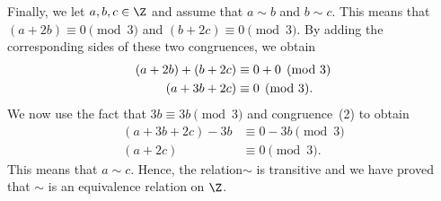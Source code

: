 \begin{enumerate}
\begin{enumerate}
\begin{myproof}
Finally, we let $a, b, c \in \Z$ and assume that $a \sim b$ and $b \sim c$.  This means that 
$\left( a + 2b \right) \equiv 0\pmod 3$ and 
$\left( b + 2c \right) \equiv 0\pmod 3$.  By adding the corresponding sides of these two congruences, we obtain
\begin{align}
\left( a + 2b \right) + \left( b + 2c \right) &\equiv 0 + 0 \pmod 3 \notag \\
\left( a + 3b + 2c \right) &\equiv 0 \pmod 3.
\end{align}
We now use the fact that $3b \equiv 3b \pmod 3$ and congruence~(2) to obtain
\begin{align*}
\left( a + 3b + 2c \right) - 3b  &\equiv 0 - 3b \pmod 3 \\
\left( a + 2c \right) &\equiv 0 \pmod 3.
\end{align*}
This means that $a \sim c$.  Hence, the relation$\sim$ is transitive and we have proved that 
$\sim$ is an equivalence relation on $\Z$.
\end{myproof}
\end{enumerate}
\end{enumerate}



